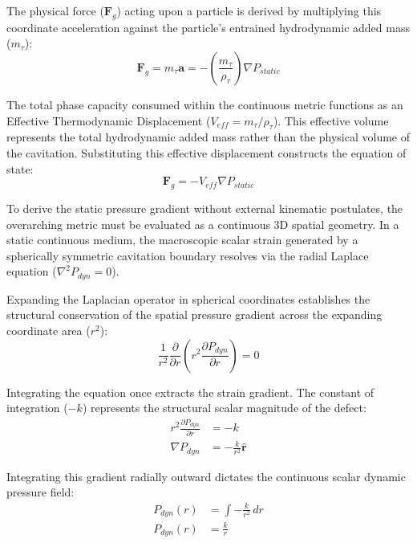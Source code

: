 The physical force ($\mathbf{F}_g$) acting upon a particle is derived by multiplying this coordinate acceleration against the particle's entrained hydrodynamic added mass ($m_\tau$):
\begin{equation}
    \mathbf{F}_g = m_\tau \mathbf{a} = - \left( \frac{m_\tau}{\rho_\tau} \right) \nabla P_{static}
\end{equation}

The total phase capacity consumed within the continuous metric functions as an Effective Thermodynamic Displacement ($V_{eff} = m_\tau / \rho_\tau$). This effective volume represents the total hydrodynamic added mass rather than the physical volume of the cavitation. Substituting this effective displacement constructs the equation of state: 
\begin{equation}
    \mathbf{F}_g = - V_{eff} \nabla P_{static} \label{eq:archimedes_gravity_base}
\end{equation}

To derive the static pressure gradient without external kinematic postulates, the overarching metric must be evaluated as a continuous 3D spatial geometry. In a static continuous medium, the macroscopic scalar strain generated by a spherically symmetric cavitation boundary resolves via the radial Laplace equation ($\nabla^2 P_{dyn} = 0$). 

Expanding the Laplacian operator in spherical coordinates establishes the structural conservation of the spatial pressure gradient across the expanding coordinate area ($r^2$):
\begin{equation}
    \frac{1}{r^2} \frac{\partial}{\partial r} \left( r^2 \frac{\partial P_{dyn}}{\partial r} \right) = 0
\end{equation}

Integrating the equation once extracts the strain gradient. The constant of integration ($-k$) represents the structural scalar magnitude of the defect:
\begin{align}
    r^2 \frac{\partial P_{dyn}}{\partial r} &= -k \nonumber \\
    \nabla P_{dyn} &= -\frac{k}{r^2} \mathbf{\hat{r}}
\end{align}

Integrating this gradient radially outward dictates the continuous scalar dynamic pressure field:
\begin{align}
    P_{dyn}(r) &= \int -\frac{k}{r^2} \, dr \nonumber \\
    P_{dyn}(r) &= \frac{k}{r}
\end{align}

